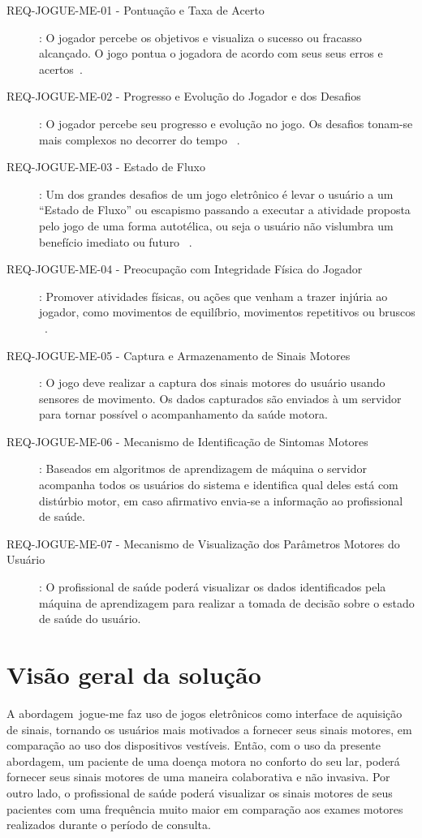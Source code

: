 \begin{description}
	\item[REQ-JOGUE-ME-01 - Pontuação e Taxa de Acerto]: O jogador percebe os objetivos e visualiza o sucesso ou fracasso alcançado. O jogo pontua o jogadora de acordo com seus seus erros e acertos~\cite{Suhonen:2008:SFE:1457199.1457204,sinclair07}.
	\item[REQ-JOGUE-ME-02 - Progresso e Evolução do Jogador e dos Desafios]: O jogador percebe seu progresso e evolução no jogo. Os desafios tonam-se mais complexos no decorrer do tempo ~\cite{Suhonen:2008:SFE:1457199.1457204}.
	\item[REQ-JOGUE-ME-03 - Estado de Fluxo]: Um dos grandes desafios de um jogo eletrônico é levar o usuário a um ``Estado de Fluxo'' ou escapismo passando a executar a atividade proposta pelo jogo de uma forma autotélica, ou seja o usuário não vislumbra um benefício imediato ou futuro ~\cite{sweetser2005-gameflow}. 
	\item[REQ-JOGUE-ME-04 - Preocupação com Integridade Física do Jogador]: Promover atividades físicas, ou ações que venham a trazer injúria ao jogador, como movimentos de equilíbrio, movimentos repetitivos ou bruscos ~\cite{arntzen2011,sinclair07}.
		\item[REQ-JOGUE-ME-05 - Captura e Armazenamento de Sinais Motores]: O jogo deve realizar a captura dos sinais motores do usuário usando sensores de movimento. Os dados capturados são enviados à um servidor para tornar possível o acompanhamento da saúde motora.
	\item[REQ-JOGUE-ME-06 - Mecanismo de Identificação de Sintomas Motores]: Baseados em algoritmos de aprendizagem de máquina o servidor acompanha todos os usuários do sistema e identifica qual deles está com distúrbio motor, em caso afirmativo envia-se a informação ao profissional de saúde.
	\item[REQ-JOGUE-ME-07 - Mecanismo de Visualização dos Parâmetros Motores do Usuário]: O profissional de saúde poderá visualizar os dados identificados pela máquina de aprendizagem para realizar a tomada de decisão sobre o estado de saúde do usuário.
\end{description}

\section{Visão geral da solução}

A abordagem~\ac{jogue-me} faz uso de jogos eletrônicos como interface de aquisição de sinais, tornando os usuários mais motivados a fornecer seus sinais motores, em comparação ao uso dos dispositivos vestíveis. Então, com o uso da presente abordagem, um paciente de uma doença motora no conforto do seu lar, poderá fornecer seus sinais motores de uma maneira colaborativa e não invasiva. Por outro lado, o profissional de saúde poderá visualizar os sinais motores de seus pacientes com uma frequência muito maior em comparação aos exames motores realizados durante o período de consulta. 

